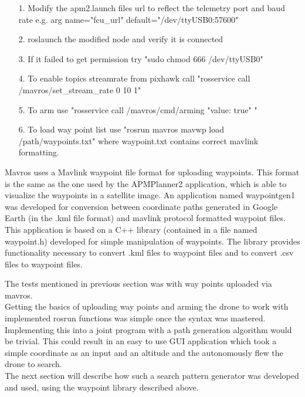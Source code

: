 \begin{itemize}

\item[1.] Modify the apm2.launch files url to reflect the telemetry port and baud rate  e.g. arg name="fcu\_url" default="/dev/ttyUSB0:57600" 
\item[2.] roslaunch the modified node and verify it is connected
\item[3.] If it failed to get permission try "sudo chmod 666 /dev/ttyUSB0"
\item[4.] To enable topics streamrate from pixhawk call "rosservice call /mavros/set\_stream\_rate 0 10 1"
\item[5.] To arm use "rosservice call /mavros/cmd/arming "value: true" "
\item[6.] To load way point list use "rosrun mavros mavwp load /path/waypoints.txt" where waypoint.txt contains correct mavlink formatting.

\end{itemize}

Mavros uses a Mavlink waypoint file format for uploading waypoints.
This format is the same as the one used by the APMPlanner2 application,
which is able to visualize the waypoints in a satellite image.
An application named waypointgen1 was developed for conversion between coordinate paths generated in Google Earth (in the .kml file format)
and mavlink protocol formatted waypoint files. This application is based on a C++ library (contained in a file named waypoint.h)
developed for simple manipulation of waypoints. The library provides functionality necessary to convert .kml files to waypoint files
and to convert .csv files to waypoint files.

The tests mentioned in previous section was with way points uploaded via mavros.\\
Getting the basics of uploading way points and arming the drone to work with implemented rosrun functions was simple once the syntax was mastered. Implementing this into a joint program with a path generation algorithm would be trivial. This could result in an easy to use GUI application which took a simple coordinate as an input and an altitude and the autonomously flew the drone to search.\\
The next section will describe how such a search pattern generator was developed and used, using the waypoint library described above.

